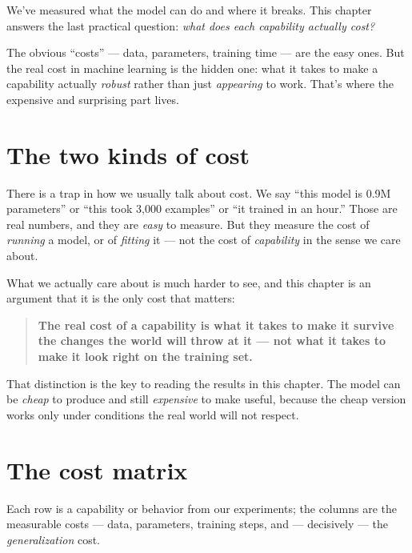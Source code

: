 We've measured what the model can do and where it breaks. This chapter
answers the last practical question: \emph{what does each capability
actually cost?}

The obvious ``costs'' --- data, parameters, training time --- are the
easy ones. But the real cost in machine learning is the hidden one: what
it takes to make a capability actually \emph{robust} rather than just
\emph{appearing} to work. That's where the expensive and surprising part
lives.

\section{The two kinds of cost}\label{the-two-kinds-of-cost}

There is a trap in how we usually talk about cost. We say ``this model
is 0.9M parameters'' or ``this took 3,000 examples'' or ``it trained in
an hour.'' Those are real numbers, and they are \emph{easy} to measure.
But they measure the cost of \emph{running} a model, or of
\emph{fitting} it --- not the cost of \emph{capability} in the sense we
care about.

What we actually care about is much harder to see, and this chapter is
an argument that it is the only cost that matters:

\begin{quote}
\textbf{The real cost of a capability is what it takes to make it
survive the changes the world will throw at it --- not what it takes to
make it look right on the training set.}
\end{quote}

That distinction is the key to reading the results in this chapter. The
model can be \emph{cheap} to produce and still \emph{expensive} to make
useful, because the cheap version works only under conditions the real
world will not respect.

\section{The cost matrix}\label{the-cost-matrix}

Each row is a capability or behavior from our experiments; the columns
are the measurable costs --- data, parameters, training steps, and ---
decisively --- the \emph{generalization} cost.

